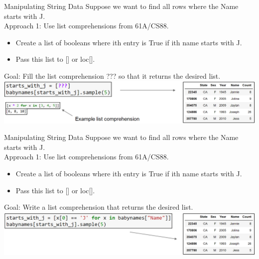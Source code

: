 \documentclass[aspectratio=169]{../latex_main/tntbeamer}  %
\begin{document}
	
	
	\begin{frame}[c]{Manipulating String Data}
	    Suppose we want to find all rows where the Name starts with J.\\
	    Approach 1: Use list comprehensions from 61A/CS88.
	    \begin{itemize}
	        \item Create a list of booleans where ith entry is True if ith name starts with J.
	        \item Pass this list to [] or loc[].
	    \end{itemize}
        Goal: Fill the list comprehension ??? so that it returns the desired list.
        \includegraphics[scale=.4]{Bild2}
	\end{frame}
	
	
	\begin{frame}[c]{Manipulating String Data}
	    Suppose we want to find all rows where the Name starts with J.\\
	    Approach 1: Use list comprehensions from 61A/CS88.
	    \begin{itemize}
	        \item Create a list of booleans where ith entry is True if ith name starts with J.
	        \item Pass this list to [] or loc[].
	    \end{itemize}
        Goal: Write a list comprehension that returns the desired list.
        \includegraphics[scale=.4]{Bild3}
	\end{frame}
	
\end{document}
